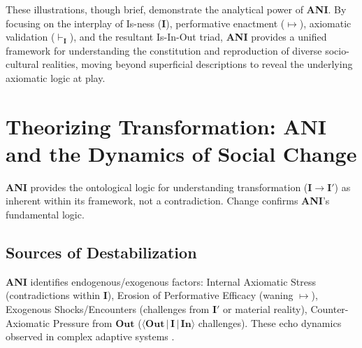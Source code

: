 \documentclass{article}
\newcommand{\ANI}{\textbf{ANI}}             %
\newcommand{\Isness}{\mathbf{I}}            %
\newcommand{\Inness}{\mathbf{In}}           %
\newcommand{\Outness}{\mathbf{Out}}         %
\newcommand{\enactment}{\ensuremath{\mapsto}} %
\newcommand{\validates}[1]{\ensuremath{\vdash_{#1}}} %
\newcommand{\orientation}[3]{\ensuremath{\langle #1 \,|\, #2 \,|\, #3 \rangle}} %
\begin{document}
These illustrations, though brief, demonstrate the analytical power of \ANI{}. By focusing on the interplay of Is-ness ($\Isness$), performative enactment ($\enactment$), axiomatic validation ($\validates{\Isness}$), and the resultant Is-In-Out triad, \ANI{} provides a unified framework for understanding the constitution and reproduction of diverse socio-cultural realities, moving beyond superficial descriptions to reveal the underlying axiomatic logic at play.

\section{Theorizing Transformation: ANI and the Dynamics of Social Change}

\ANI{} provides the ontological logic for understanding transformation ($\Isness \rightarrow \Isness'$) as inherent within its framework, not a contradiction. Change confirms \ANI{}'s fundamental logic.

\subsection{Sources of Destabilization}

\ANI{} identifies endogenous/exogenous factors: Internal Axiomatic Stress (contradictions within $\Isness$), Erosion of Performative Efficacy (waning $\enactment$), Exogenous Shocks/Encounters (challenges from $\Isness'$ or material reality), Counter-Axiomatic Pressure from $\Outness$ ($\orientation{\Outness}{\Isness}{\Inness}$ challenges). These echo dynamics observed in complex adaptive systems \citep{Prigogine1984, Bateson1972}.
\end{document}
